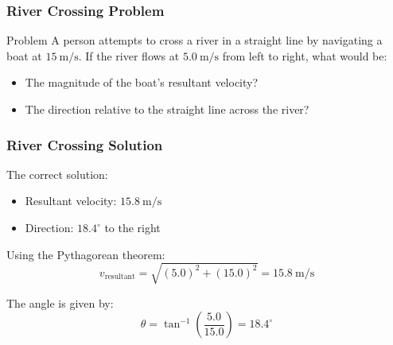 \documentclass{beamer}
\begin{document}
\begin{frame}
\frametitle{River Crossing Problem}
\begin{block}{Problem}
A person attempts to cross a river in a straight line by navigating a boat at $15 \mathrm{~m} / \mathrm{s}$. If the river flows at $5.0 \mathrm{~m} / \mathrm{s}$ from left to right, what would be:
\begin{itemize}
    \item The magnitude of the boat's resultant velocity?
    \item The direction relative to the straight line across the river?
\end{itemize}
\end{block}

\begin{center}
\end{center}

\end{frame}

\begin{frame}
\frametitle{River Crossing Solution}

The correct solution:
\begin{itemize}
    \item Resultant velocity: $15.8 \mathrm{~m} / \mathrm{s}$
    \item Direction: $18.4^{\circ}$ to the right
\end{itemize}


Using the Pythagorean theorem:
\[v_\text{resultant} = \sqrt{(5.0)^2 + (15.0)^2} = 15.8 \mathrm{~m}/\mathrm{s}\]

The angle is given by:
\[\theta = \tan^{-1}\left(\frac{5.0}{15.0}\right) = 18.4^\circ\]

\end{frame}
\end{document}
